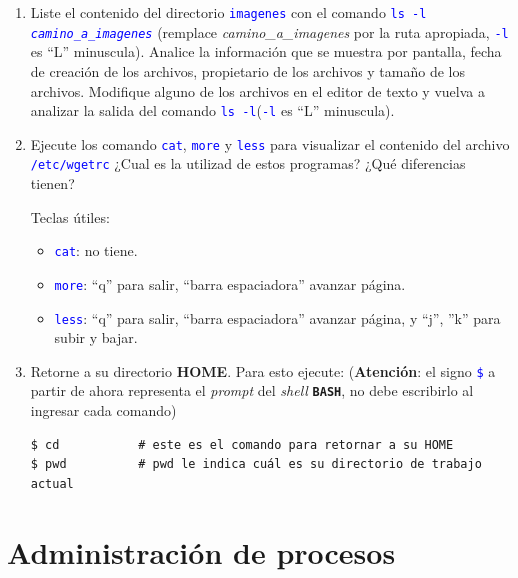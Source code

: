 \documentclass[12pt]{article}
\newcommand{\cw}[1]{\texttt{\textcolor{blue}{#1}}}
\newcommand{\bash}{\textbf{\texttt{BASH}}}
\begin{document}
\begin{enumerate}[resume]
    \item Liste el contenido del directorio \cw{imagenes} con el comando \cw{ls
        -l \emph{camino\_a\_imagenes}} (remplace \emph{camino\_a\_imagenes}
        por la ruta apropiada, \cw{-l} es ``L'' minuscula). Analice la
        información que se muestra por pantalla, fecha de creación de los
        archivos, propietario de los archivos y tamaño de los archivos.
        Modifique alguno de los archivos en el editor de texto y vuelva a
        analizar la salida del comando \cw{ls -l}(\cw{-l} es ``L'' minuscula).

    \item Ejecute los comando \cw{cat}, \cw{more} y \cw{less} para visualizar
        el contenido del archivo \cw{/etc/wgetrc} ¿Cual es la utilizad de
        estos programas? ¿Qué diferencias tienen?

    Teclas útiles:

    \begin{itemize}

        \itemsep2pt \parskip0pt 

        \item \cw{cat}: no tiene.

        \item \cw{more}: ``q'' para salir, ``barra espaciadora'' avanzar
            página.

        \item \cw{less}: ``q'' para salir, ``barra espaciadora'' avanzar
            página, y ``j'', ''k'' para subir y bajar.

    \end{itemize}

    \item Retorne a su directorio \textbf{HOME}. Para esto ejecute:
        (\textbf{Atención}: el signo \cw{\$} a partir de ahora representa el
        \emph{prompt} del \emph{shell} \bash, no debe escribirlo al ingresar
        cada comando)

        \begin{verbatim}
$ cd           # este es el comando para retornar a su HOME
$ pwd          # pwd le indica cuál es su directorio de trabajo actual
        \end{verbatim}

\end{enumerate}

\section{Administración de procesos}
\end{document}
